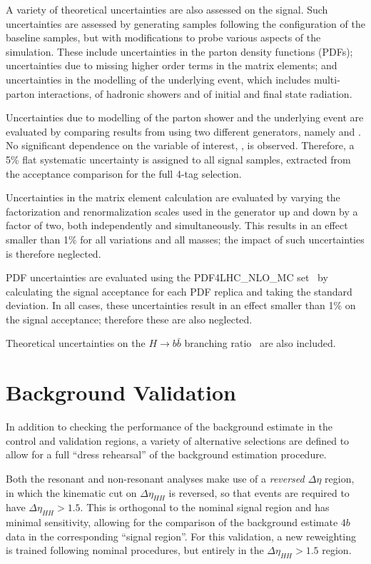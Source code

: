 A variety of theoretical uncertainties are also assessed on the signal. Such uncertainties 
are assessed by generating samples following the configuration of the baseline samples,
but with modifications to probe various aspects of the simulation. These include
uncertainties in the parton density functions (PDFs); uncertainties due to
missing higher order terms in the matrix elements; and uncertainties in the
modelling of the underlying event, which includes multi-parton interactions, of
hadronic showers and of initial and final state radiation. 

Uncertainties due to modelling of the parton shower and the underlying event are 
evaluated by comparing results from using two different generators, namely \HERWIG[7.1.3]
and \PYTHIA[8.235]. No significant dependence on the variable of interest, \mhh, is observed.
Therefore, a 5\% flat systematic uncertainty is assigned to all signal samples, extracted from 
the acceptance comparison for the full 4-tag selection.

Uncertainties in the matrix element calculation are evaluated by varying the factorization 
and renormalization scales used in the generator up and down by a factor of two, both independently and simultaneously.
This results in an effect smaller than 1\% for all variations and all masses; the impact of such uncertainties 
is therefore neglected.

PDF uncertainties are evaluated using the PDF4LHC\_NLO\_MC set~\cite{Butterworth:2015oua} by 
calculating the signal acceptance for each PDF replica and taking the standard deviation. 
In all cases, these uncertainties result in an effect smaller than 1\% on the signal acceptance; 
therefore these are also neglected.

Theoretical uncertainties on the $H \to b\bar{b}$ branching ratio~\cite{deFlorian:2227475} are also 
included.

\FloatBarrier
\clearpage
\section{Background Validation}
\label{sec:bkdg-validation}
In addition to checking the performance of the background estimate in the control and 
validation regions, a variety of alternative selections are defined to allow for a 
full ``dress rehearsal'' of the background estimation procedure. 

Both the resonant and non-resonant analyses make use of a \emph{reversed $\Delta \eta$}
region, in which the kinematic cut on $\Delta \eta_{HH}$ is reversed, so that events are
required to have $\Delta \eta_{HH} > 1.5$. This is orthogonal to the nominal signal 
region and has minimal sensitivity, allowing for the comparison of the background
estimate $4b$ data in the corresponding ``signal region''. For this validation, 
a new reweighting is trained following nominal procedures, but entirely in the 
$\Delta \eta_{HH} > 1.5$ region.

